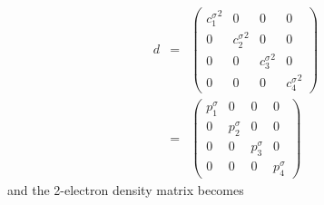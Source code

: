 \documentclass[pra,nofootinbib]{revtex4-1}
\begin{document}
\begin{eqnarray}
   d &=&
   \begin{pmatrix}
   \left.c_{1}^\sigma\right.^2 & 0                           & 0                           & 0 \\
   0                           & \left.c_{2}^\sigma\right.^2 & 0                           & 0 \\
   0                           & 0                           & \left.c_{3}^\sigma\right.^2 & 0 \\
   0                           & 0                           & 0                           & \left.c_{4}^\sigma\right.^2
   \end{pmatrix} \\
   &=&
   \begin{pmatrix}
   p_{1}^\sigma & 0            & 0            & 0 \\
   0            & p_{2}^\sigma & 0            & 0 \\
   0            & 0            & p_{3}^\sigma & 0 \\
   0            & 0            & 0            & p_{4}^\sigma
   \end{pmatrix}
\end{eqnarray}
and the 2-electron density matrix becomes
\end{document}
